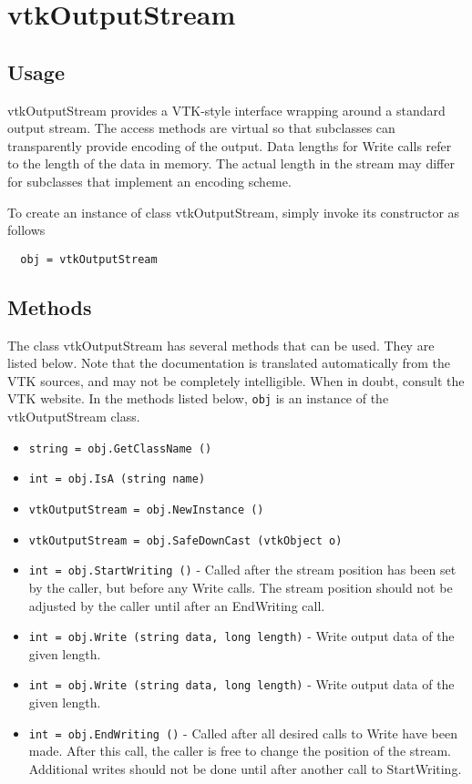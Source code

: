 \section{vtkOutputStream}

\subsection{Usage}

 vtkOutputStream provides a VTK-style interface wrapping around a
 standard output stream.  The access methods are virtual so that
 subclasses can transparently provide encoding of the output.  Data
 lengths for Write calls refer to the length of the data in memory.
 The actual length in the stream may differ for subclasses that
 implement an encoding scheme.

To create an instance of class vtkOutputStream, simply
invoke its constructor as follows
\begin{verbatim}
  obj = vtkOutputStream
\end{verbatim}
\subsection{Methods}

The class vtkOutputStream has several methods that can be used.
  They are listed below.
Note that the documentation is translated automatically from the VTK sources,
and may not be completely intelligible.  When in doubt, consult the VTK website.
In the methods listed below, \verb|obj| is an instance of the vtkOutputStream class.
\begin{itemize}
\item  \verb|string = obj.GetClassName ()|

\item  \verb|int = obj.IsA (string name)|

\item  \verb|vtkOutputStream = obj.NewInstance ()|

\item  \verb|vtkOutputStream = obj.SafeDownCast (vtkObject o)|

\item  \verb|int = obj.StartWriting ()| -  Called after the stream position has been set by the caller, but
 before any Write calls.  The stream position should not be
 adjusted by the caller until after an EndWriting call.

\item  \verb|int = obj.Write (string data, long length)| -  Write output data of the given length.

\item  \verb|int = obj.Write (string data, long length)| -  Write output data of the given length.

\item  \verb|int = obj.EndWriting ()| -  Called after all desired calls to Write have been made.  After
 this call, the caller is free to change the position of the
 stream.  Additional writes should not be done until after another
 call to StartWriting.

\end{itemize}
